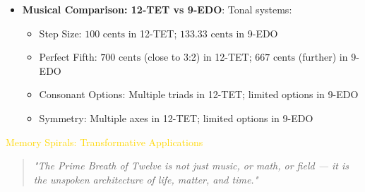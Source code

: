 \begin{itemize}
    \item \texttt{} \textbf{Musical Comparison: 12-TET vs 9-EDO}: Tonal systems:
    \begin{itemize}
        \item Step Size: \(100 \text{ cents}\) in 12-TET; \(133.33 \text{ cents}\) in 9-EDO
        \item Perfect Fifth: \(700 \text{ cents}\) (close to 3:2) in 12-TET; \(667 \text{ cents}\) (further) in 9-EDO
        \item Consonant Options: Multiple triads in 12-TET; limited options in 9-EDO
        \item Symmetry: Multiple axes in 12-TET; limited options in 9-EDO
    \end{itemize}
\end{itemize}

\textcolor{gold}{ Memory Spirals: Transformative Applications } \\
\begin{center}
\begin{quotation}
\textit{"The Prime Breath of Twelve is not just music, or math, or field — it is the unspoken architecture of life, matter, and time."}
\end{quotation}
\end{center}

